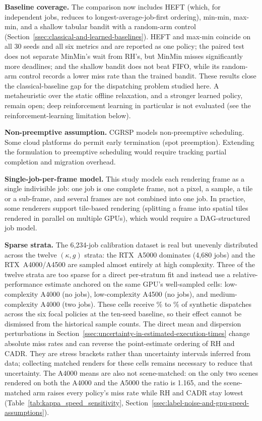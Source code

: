 {\textbf{Baseline coverage.} The comparison now includes HEFT (which, for independent jobs, reduces to longest-average-job-first ordering), min-min, max-min, and a shallow tabular bandit with a random-arm control (Section~\ref{ssec:classical-and-learned-baselines}). HEFT and max-min coincide on all 30 seeds and all six metrics and are reported as one policy; the paired test does not separate MinMin's wait from RH's, but MinMin misses significantly more deadlines; and the shallow bandit does not beat FIFO, while its random-arm control records a lower miss rate than the trained bandit. These results close the classical-baseline gap for the dispatching problem studied here. A metaheuristic over the static offline relaxation, and a stronger learned policy, remain open; deep reinforcement learning in particular is not evaluated (see the reinforcement-learning limitation below).

\textbf{Non-preemptive assumption.} CGRSP models non-preemptive scheduling. Some cloud platforms do permit early termination (spot preemption). Extending the formulation to preemptive scheduling would require tracking partial completion and migration overhead.

\textbf{Single-job-per-frame model.} This study models each rendering frame as a single indivisible job: one job is one complete frame, not a pixel, a sample, a tile or a sub-frame, and several frames are not combined into one job. In practice, some renderers support tile-based rendering (splitting a frame into spatial tiles rendered in parallel on multiple GPUs), which would require a DAG-structured job model.

\textbf{Sparse strata.} The 6,234-job calibration dataset is real but unevenly distributed across the twelve $(\kappa, g)$ strata: the RTX~A5000 dominates (4,680 jobs) and the RTX~A4000/A4500 are sampled almost entirely at high complexity. Three of the twelve strata are too sparse for a direct per-stratum fit and instead use a relative-performance estimate anchored on the same GPU's well-sampled cells: low-complexity A4000 (no jobs), low-complexity A4500 (no jobs), and medium-complexity A4000 (two jobs). These cells receive \SparseExposureLo\% to \SparseExposureHi\% of synthetic dispatches across the six focal policies at the ten-seed baseline, so their effect cannot be dismissed from the historical sample counts. The direct mean and dispersion perturbations in Section~\ref{ssec:uncertainty-in-estimated-execution-times} change absolute miss rates and can reverse the point-estimate ordering of RH and CADR. They are stress brackets rather than uncertainty intervals inferred from data; collecting matched renders for these cells remains necessary to reduce that uncertainty. The A4000 means are also not scene-matched: on the only two scenes rendered on both the A4000 and the A5000 the ratio is 1.165, and the scene-matched arm raises every policy's miss rate while RH and CADR stay lowest (Table~\ref{tab:kappa_speed_sensitivity}, Section~\ref{ssec:label-noise-and-gpu-speed-assumptions}).

}
